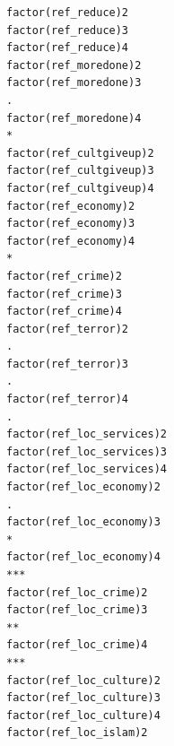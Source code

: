 \documentclass[
]{article}
\begin{document}
\begin{table}
\begin{minipage}[t]{\linewidth}
{\begin{verbatim}
factor(ref_reduce)2                                                                  
factor(ref_reduce)3                                                                  
factor(ref_reduce)4                                                                  
factor(ref_moredone)2                                                                
factor(ref_moredone)3                                                             .  
factor(ref_moredone)4                                                             *  
factor(ref_cultgiveup)2                                                              
factor(ref_cultgiveup)3                                                              
factor(ref_cultgiveup)4                                                              
factor(ref_economy)2                                                                 
factor(ref_economy)3                                                                 
factor(ref_economy)4                                                              *  
factor(ref_crime)2                                                                   
factor(ref_crime)3                                                                   
factor(ref_crime)4                                                                   
factor(ref_terror)2                                                               .  
factor(ref_terror)3                                                               .  
factor(ref_terror)4                                                               .  
factor(ref_loc_services)2                                                            
factor(ref_loc_services)3                                                            
factor(ref_loc_services)4                                                            
factor(ref_loc_economy)2                                                          .  
factor(ref_loc_economy)3                                                          *  
factor(ref_loc_economy)4                                                          ***
factor(ref_loc_crime)2                                                               
factor(ref_loc_crime)3                                                            ** 
factor(ref_loc_crime)4                                                            ***
factor(ref_loc_culture)2                                                             
factor(ref_loc_culture)3                                                             
factor(ref_loc_culture)4                                                             
factor(ref_loc_islam)2                                                               

\end{verbatim}}
\end{minipage}
\end{table}
\end{document}
